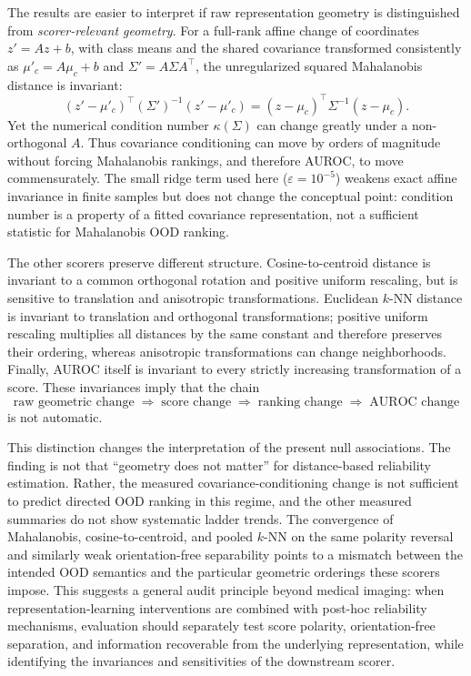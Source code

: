 
The results are easier to interpret if raw representation geometry is distinguished from \emph{scorer-relevant geometry}. For a full-rank affine change of coordinates $z' = Az+b$, with class means and the shared covariance transformed consistently as $\mu'_c=A\mu_c+b$ and $\Sigma'=A\Sigma A^\top$, the unregularized squared Mahalanobis distance is invariant:
\begin{equation}
(z'-\mu'_c)^\top (\Sigma')^{-1}(z'-\mu'_c)
= (z-\mu_c)^\top \Sigma^{-1}(z-\mu_c).
\label{eq:mahal-invariance}
\end{equation}
Yet the numerical condition number $\kappa(\Sigma)$ can change greatly under a non-orthogonal $A$. Thus covariance conditioning can move by orders of magnitude without forcing Mahalanobis rankings, and therefore AUROC, to move commensurately. The small ridge term used here ($\varepsilon=10^{-5}$) weakens exact affine invariance in finite samples but does not change the conceptual point: condition number is a property of a fitted covariance representation, not a sufficient statistic for Mahalanobis OOD ranking.

The other scorers preserve different structure. Cosine-to-centroid distance is invariant to a common orthogonal rotation and positive uniform rescaling, but is sensitive to translation and anisotropic transformations. Euclidean $k$-NN distance is invariant to translation and orthogonal transformations; positive uniform rescaling multiplies all distances by the same constant and therefore preserves their ordering, whereas anisotropic transformations can change neighborhoods. Finally, AUROC itself is invariant to every strictly increasing transformation of a score. These invariances imply that the chain
\[
\text{raw geometric change} \;\Rightarrow\; \text{score change} \;\Rightarrow\; \text{ranking change} \;\Rightarrow\; \text{AUROC change}
\]
is not automatic.

This distinction changes the interpretation of the present null associations. The finding is not that ``geometry does not matter'' for distance-based reliability estimation. Rather, the measured covariance-conditioning change is not sufficient to predict directed OOD ranking in this regime, and the other measured summaries do not show systematic ladder trends. The convergence of Mahalanobis, cosine-to-centroid, and pooled $k$-NN on the same polarity reversal and similarly weak orientation-free separability points to a mismatch between the intended OOD semantics and the particular geometric orderings these scorers impose. This suggests a general audit principle beyond medical imaging: when representation-learning interventions are combined with post-hoc reliability mechanisms, evaluation should separately test score polarity, orientation-free separation, and information recoverable from the underlying representation, while identifying the invariances and sensitivities of the downstream scorer.
